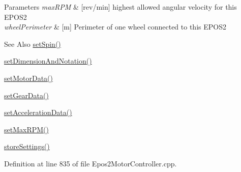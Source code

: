 \begin{DoxyParams}{Parameters}
{\em max\-R\-P\-M} & \mbox{[}rev/min\mbox{]} highest allowed angular velocity for this E\-P\-O\-S2 \\
\hline
{\em wheel\-Perimeter} & \mbox{[}m\mbox{]} Perimeter of one wheel connected to this E\-P\-O\-S2\\
\hline
\end{DoxyParams}
\begin{DoxySeeAlso}{See Also}
\hyperlink{classEpos2MotorController_a2ff727bd7ad81302c2feaaf297d888ae}{set\-Spin()} 

\hyperlink{classEpos2MotorController_a8eb9d184e96079a5a995776cf3a453f2}{set\-Dimension\-And\-Notation()} 

\hyperlink{classEpos2MotorController_a0a5257b20692de37091544e6ed5f6aed}{set\-Motor\-Data()} 

\hyperlink{classEpos2MotorController_a6c806fba7028bed11d710c4f453869b1}{set\-Gear\-Data()} 

\hyperlink{classEpos2MotorController_aada27a05c4f5150f7b2d2b3ec20a8f84}{set\-Acceleration\-Data()} 

\hyperlink{classEpos2MotorController_a60d132d6d79c0b8d49eb5ed721aae790}{set\-Max\-R\-P\-M()} 

\hyperlink{classEpos2MotorController_a2e1ad71a3be2943ed7bffd743c4f1fad}{store\-Settings()} 
\end{DoxySeeAlso}


Definition at line 835 of file Epos2\-Motor\-Controller.\-cpp.


